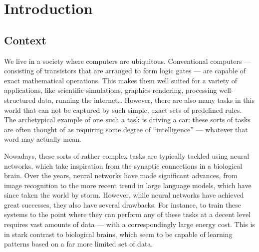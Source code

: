 \chapter{Introduction}\label{ch:Introduction}

\section{Context}
We live in a society where computers are ubiquitous. %
Conventional computers --- consisting of transistors that are arranged to form logic gates --- are capable of exact mathematical operations.
This makes them well suited for a variety of applications, like scientific simulations, graphics rendering, processing well-structured data, running the internet\dots
However, there are also many tasks in this world that can not be captured by such simple, exact sets of predefined rules.
The archetypical example of one such a task is driving a car: these sorts of tasks are often thought of as requiring some degree of ``intelligence'' --- whatever that word may actually mean. \par
Nowadays, these sorts of rather complex tasks are typically tackled using neural networks, which take inspiration from the synaptic connections in a biological brain.
Over the years, neural networks have made significant advances, from image recognition to the more recent trend in large language models, which have since taken the world by storm.
However, while neural networks have achieved great successes, they also have several drawbacks.
For instance, to train these systems to the point where they can perform any of these tasks at a decent level requires vast amounts of data --- with a correspondingly large energy cost. %
This is in stark contrast to biological brains, which seem to be capable of learning patterns based on a far more limited set of data.


